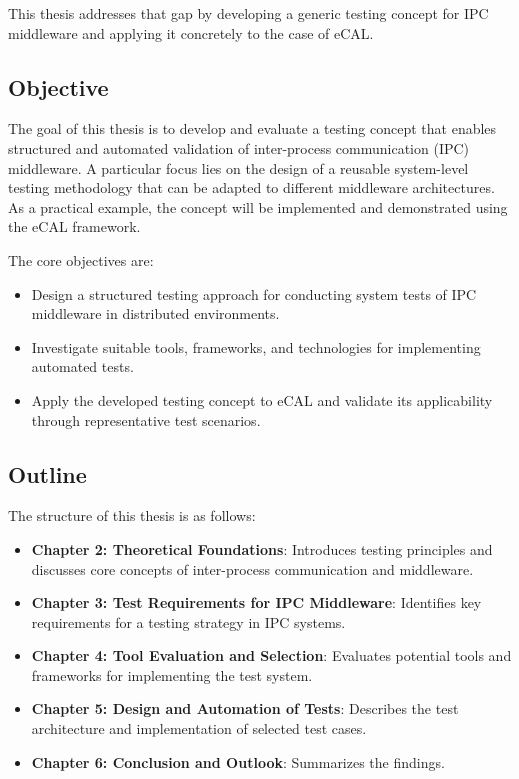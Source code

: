 \vspace{1em}
This thesis addresses that gap by developing a generic testing concept for IPC middleware and applying it concretely to the case of eCAL.

\subsection{Objective}

The goal of this thesis is to develop and evaluate a testing concept that enables structured and automated validation of inter-process communication (IPC) middleware. A particular focus lies on the design of a reusable system-level testing methodology that can be adapted to different middleware architectures. As a practical example, the concept will be implemented and demonstrated using the eCAL framework.

\vspace{1em}
The core objectives are:

\begin{itemize}
	\item Design a structured testing approach for conducting system tests of IPC middleware in distributed environments.
	\item Investigate suitable tools, frameworks, and technologies for implementing automated tests.
	\item Apply the developed testing concept to eCAL and validate its applicability through representative test scenarios.
\end{itemize}

\subsection{Outline}

The structure of this thesis is as follows:

\begin{itemize}
	\item \textbf{Chapter 2: Theoretical Foundations}:  Introduces testing principles and discusses core concepts of inter-process communication and middleware.
	\item \textbf{Chapter 3: Test Requirements for IPC Middleware}: Identifies key requirements for a testing strategy in IPC systems.
	\item \textbf{Chapter 4: Tool Evaluation and Selection}: Evaluates potential tools and frameworks for implementing the test system.
	\item \textbf{Chapter 5: Design and Automation of Tests}: Describes the test architecture and implementation of selected test cases.
	\item \textbf{Chapter 6: Conclusion and Outlook}: Summarizes the findings.
\end{itemize}







